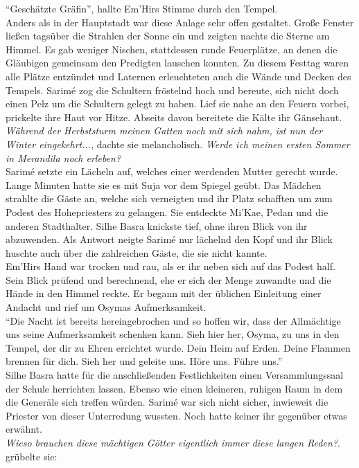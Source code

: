 ``Geschätzte Gräfin'', hallte Em'Hirs Stimme durch den Tempel.\\
Anders als in der Hauptstadt war diese Anlage sehr offen gestaltet. Große Fenster ließen tagsüber 
die Strahlen der Sonne ein und zeigten nachts die Sterne am Himmel. Es gab weniger Nischen, 
stattdessen runde Feuerplätze, an denen die Gläubigen gemeinsam den Predigten lauschen konnten. Zu 
diesem Festtag waren alle Plätze entzündet und Laternen erleuchteten auch die Wände und Decken des 
Tempels. Sarimé zog die Schultern fröstelnd hoch und bereute, sich nicht doch einen Pelz um die 
Schultern gelegt zu haben. Lief sie nahe an den Feuern vorbei, prickelte ihre Haut vor Hitze. 
Abseits davon bereitete die Kälte ihr Gänsehaut.\\
\textit{Während der Herbststurm meinen Gatten noch mit sich nahm, ist nun der Winter 
eingekehrt...}, dachte sie melancholisch. \textit{Werde ich meinen ersten Sommer in Merandila noch 
erleben?}\\
Sarimé setzte ein Lächeln auf, welches einer werdenden Mutter gerecht wurde. Lange Minuten hatte 
sie es mit Suja vor dem Spiegel geübt. Das Mädchen strahlte die Gäste an, welche sich verneigten 
und ihr Platz schafften um zum Podest des Hohepriesters zu gelangen. Sie entdeckte Mi'Kae, Pedan 
und die anderen Stadthalter. Silhe Basra knickste tief, ohne ihren Blick von ihr abzuwenden. Als 
Antwort neigte Sarimé nur lächelnd den Kopf und ihr Blick huschte auch über die zahlreichen Gäste, 
die sie nicht kannte.\\
Em'Hirs Hand war trocken und rau, als er ihr neben sich auf das Podest half. Sein Blick prüfend und 
berechnend, ehe er sich der Menge zuwandte und die Hände in den Himmel reckte. Er begann mit der 
üblichen Einleitung einer Andacht und rief um Osymas Aufmerksamkeit.\\
``Die Nacht ist bereits hereingebrochen und so hoffen wir, dass der Allmächtige uns seine 
Aufmerksamkeit schenken kann. Sieh hier her, Osyma, zu uns in den Tempel, der dir zu Ehren 
errichtet wurde. Dein Heim auf Erden. Deine Flammen brennen für dich. Sieh her und geleite uns. 
Höre uns. Führe uns.''\\
Silhe Basra hatte für die anschließenden Festlichkeiten einen Versammlungssaal der Schule 
herrichten lassen. Ebenso wie einen kleineren, ruhigen Raum in dem die Generäle sich treffen 
würden. Sarimé war sich nicht sicher, inwieweit die Priester von dieser Unterredung wussten. Noch 
hatte keiner ihr gegenüber etwas erwähnt.\\
\textit{Wieso brauchen diese mächtigen Götter eigentlich immer diese langen Reden?}. grübelte sie: 
